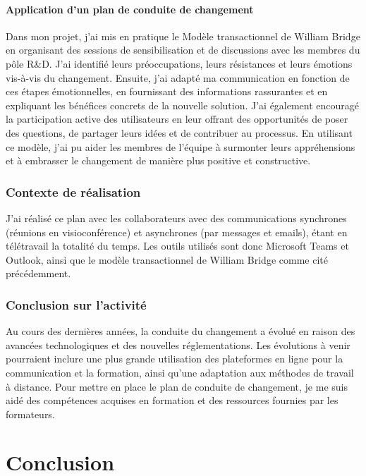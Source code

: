 \documentclass[a4paper, 11pt]{report}
\begin{document}
\subsubsection{Application d'un plan de conduite de changement}
Dans mon projet, j'ai mis en pratique le Modèle transactionnel de
William Bridge en organisant des sessions de sensibilisation et de
discussions avec les membres du pôle R\&D. J'ai identifié leurs
préoccupations, leurs résistances et leurs émotions vis-à-vis du
changement. Ensuite, j'ai adapté ma communication en fonction de ces
étapes émotionnelles, en fournissant des informations rassurantes et en
expliquant les bénéfices concrets de la nouvelle solution. J'ai
également encouragé la participation active des utilisateurs en leur
offrant des opportunités de poser des questions, de partager leurs idées
et de contribuer au processus. En utilisant ce modèle, j'ai pu aider les
membres de l'équipe à surmonter leurs appréhensions et à embrasser le
changement de manière plus positive et constructive.
\subsection{Contexte de réalisation}
J'ai réalisé ce plan avec les collaborateurs avec des communications
synchrones (réunions en visioconférence) et asynchrones (par messages et
emails), étant en télétravail la totalité du temps. Les outils utilisés
sont donc Microsoft Teams et Outlook, ainsi que le modèle transactionnel
de William Bridge comme cité précédemment.
\subsection{Conclusion sur l'activité}
Au cours des dernières années, la conduite du changement a évolué en
raison des avancées technologiques et des nouvelles réglementations. Les
évolutions à venir pourraient inclure une plus grande utilisation des
plateformes en ligne pour la communication et la formation, ainsi qu'une
adaptation aux méthodes de travail à distance.
\newline
\newline
Pour mettre en place le plan de conduite de changement, je me suis aidé
des compétences acquises en formation et des ressources fournies par les
formateurs.
\chapter{Conclusion}
\end{document}
